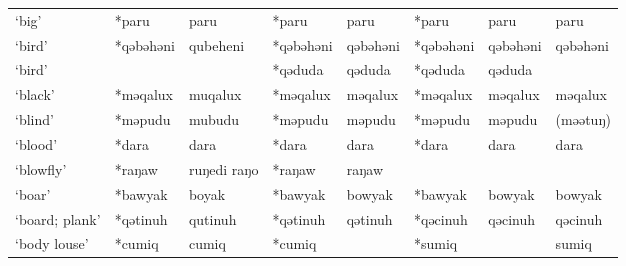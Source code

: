 \begin{landscape}
\begin{longtable}[c]{@{}p{3cm}<{\raggedright}p{2.75cm}<{\raggedright}p{2.75cm}<{\raggedright}p{2.75cm}<{\raggedright}p{2.75cm}<{\raggedright}p{2.75cm}<{\raggedright}p{2.75cm}<{\raggedright}p{2.75cm}<{\raggedright}@{}}
`big'                                                & *paru        & paru                          & *paru          & paru                       & *paru            & paru                     & paru                              \\
`bird'                                               & *qəbəhəni    & qubeheni                      & *qəbəhəni      & qəbəhəni                   & *qəbəhəni        & qəbəhəni                 & qəbəhəni                          \\
`bird'                                               &              &                               & *qəduda        & qəduda                     & *qəduda          & qəduda                   &                                   \\
`black'                                              & *məqalux     & muqalux                       & *məqalux       & məqalux                    & *məqalux         & məqalux                  & məqalux                           \\
`blind'                                              & *məpudu      & mubudu                        & *məpudu        & məpudu                     & *məpudu          & məpudu                   & (məətuŋ)                          \\
`blood'                                              & *dara        & dara                          & *dara          & dara                       & *dara            & dara                     & dara                              \\
`blowfly'                                            & *raŋaw       & ruŋedi raŋo                   & *raŋaw         & raŋaw                      &                  &                          &                                   \\
`boar'                                               & *bawyak      & boyak                         & *bawyak        & bowyak                     & *bawyak          & bowyak                   & bowyak                            \\
`board; plank'                                       & *qətinuh     & qutinuh                       & *qətinuh       & qətinuh                    & *qəcinuh         & qəcinuh                  & qəcinuh                           \\
`body louse'                                         & *cumiq       & cumiq                         & *cumiq         &                            & *sumiq           &                          & sumiq                             \\

\end{longtable}
\end{landscape}
